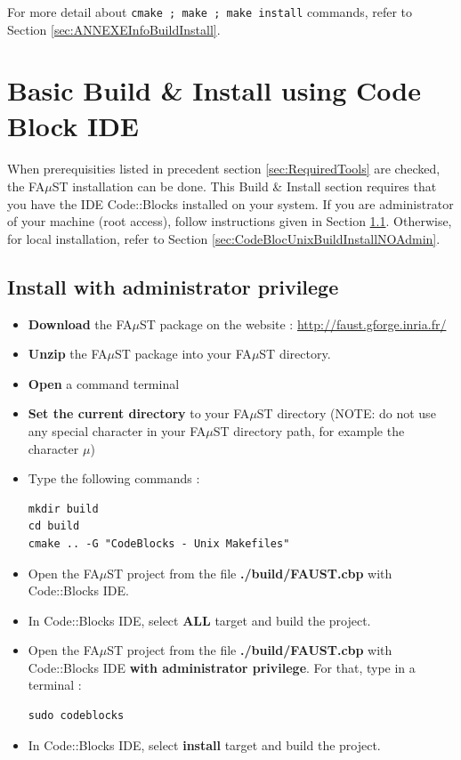 For more detail about \texttt{cmake ; make ; make install} commands, refer to Section \ref{sec:ANNEXEInfoBuildInstall}.




\section{Basic Build \& Install using Code Block IDE}\label{sec:UnixInstallCodeBlock}
\paragraph{}When prerequisities listed in precedent section \ref{sec:RequiredTools} are checked, the FA$\mu$ST installation can be done. This Build \& Install section requires that you have the IDE Code::Blocks installed on your system. If you are administrator of your machine (root access), follow instructions given in Section \ref{sec:CodeBlocUnixBuildInstallAdmin}. Otherwise, for local installation, refer to Section \ref{sec:CodeBlocUnixBuildInstallNOAdmin}. 

\subsection{Install with administrator privilege}\label{sec:CodeBlocUnixBuildInstallAdmin}
\begin{itemize}
\item \textbf{Download} the FA$\mu$ST package on the website :  \url{http://faust.gforge.inria.fr/}
\item \textbf{Unzip} the FA$\mu$ST package into your FA$\mu$ST directory.
\item \textbf{Open} a command terminal
\item \textbf{Set the current directory} to your FA$\mu$ST directory (NOTE: do not use any special character in your FA$\mu$ST directory path, for example the character $\mu$)
\item Type the following commands : 
\begin{lstlisting}
mkdir build
cd build
cmake .. -G "CodeBlocks - Unix Makefiles"
\end{lstlisting}

\item Open the FA$\mu$ST project from the file \textbf{./build/FAUST.cbp} with Code::Blocks IDE. 
\item In Code::Blocks IDE, select \textbf{ALL} target and build the project. 
\item Open the FA$\mu$ST project from the file \textbf{./build/FAUST.cbp} with Code::Blocks IDE \textbf{with administrator privilege}. For that, type in a terminal :
\begin{lstlisting}
sudo codeblocks
\end{lstlisting}
\item In Code::Blocks IDE, select \textbf{install} target and build the project. 
\end{itemize}

